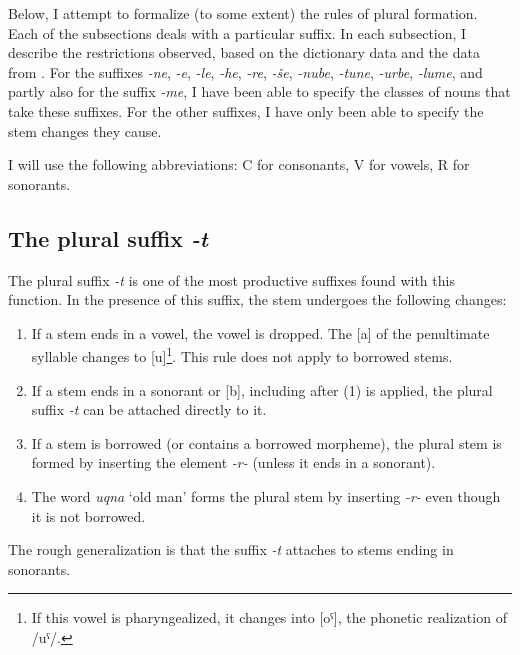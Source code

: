 ﻿\documentclass[output=paper]{langsci/langscibook}
\begin{document}
Below, I attempt to formalize (to some extent) the rules of plural
formation. Each of the subsections deals with a particular suffix. In
each subsection, I describe the restrictions observed, based on the
dictionary data and the data from \citet{magometov1982}. For the suffixes
\emph{-ne}, \emph{-e}, \emph{-le}, \emph{-he}, \emph{-re}, \emph{-še},
\emph{-nube}, \emph{-tune}, \emph{-urbe}, \emph{-lume}, and partly also for
the suffix \emph{-me}, I have been able to specify the classes of nouns that
take these suffixes. For the other suffixes, I have only been able to
specify the stem changes they cause.

I will use the following abbreviations: C for consonants, V for vowels,
R for sonorants.

\subsection{The plural suffix \emph{-t}}
  \label{the-plural-suffix--t}

The plural suffix \emph{-t} is one of the most productive suffixes found with this function. In the presence of
this suffix, the stem undergoes the following changes:
\begin{enumerate}[topsep=\medskipamount,itemsep=0pt,partopsep=0pt,parsep=0pt,label={\arabic*})]
\item %
  If a stem ends in a vowel, the vowel is dropped. The [a] of the
penultimate syllable changes to [u]\footnote{If this vowel is
  pharyngealized, it changes into [oˤ], the phonetic realization of
  /uˤ/.}. This rule does not apply to borrowed stems.

\item %
  If a stem ends in a sonorant or [b], including after (1) is
applied, the plural suffix \emph{-t} can be attached directly to it.

\item %
  If a stem is borrowed (or contains a borrowed morpheme), the plural
stem is formed by inserting the element \emph{-r-} (unless it ends in a
sonorant).

\item %
  The word \emph{uqna} `old man' forms the plural stem by inserting \emph{-r-}
even though it is not borrowed.
\end{enumerate}

The rough generalization is that the suffix \emph{-t} attaches to stems
ending in sonorants.

\end{document}
